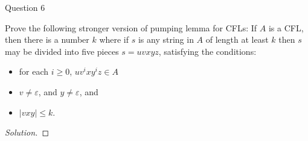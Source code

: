 \begin{solution}{Question 6}\label{ques:6}
    \begin{question}
    Prove the following stronger version of pumping lemma for CFLs: 
If $A$ is a CFL, then there is a number $k$ where if $s$ is any string in $A$ of length at least $k$ then $s$ may be divided into five pieces $s = uvxyz$, satisfying the conditions:
\begin{itemize}
    \item for each $i\geq 0$, $uv^ixy^iz \in A$
    \item $v \neq \varepsilon$, and $y \neq \varepsilon$, and
    \item $|vxy| \leq k$.
\end{itemize}
    \end{question}
    \tcblower{}
    \begin{proof}[Solution]
    \end{proof}
\end{solution}
